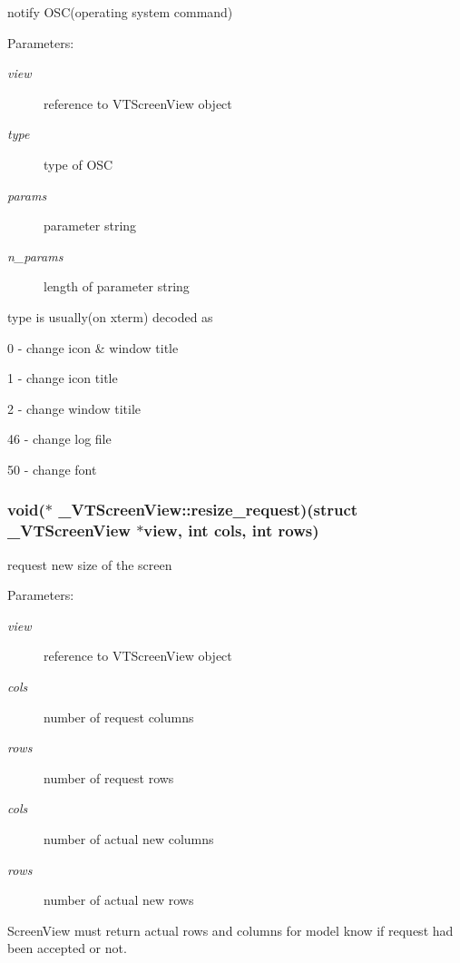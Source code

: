 notify OSC(operating system command)

\begin{Desc}
\item[Parameters:]
\begin{description}
\item[{\em view}]reference to VTScreen\-View object \item[{\em type}]type of OSC \item[{\em params}]parameter string \item[{\em n\_\-params}]length of parameter string\end{description}
\end{Desc}
type is usually(on xterm) decoded as \par
 0 - change icon \& window title \par
 1 - change icon title \par
 2 - change window titile \par
 46 - change log file \par
 50 - change font \par
\subsubsection{\setlength{\rightskip}{0pt plus 5cm}void($\ast$ \_\-VTScreen\-View::resize\_\-request)(struct \_\-VTScreen\-View $\ast$view, int cols, int rows)}\label{struct__VTScreenView_m7}


request new size of the screen

\begin{Desc}
\item[Parameters:]
\begin{description}
\item[{\em view}]reference to VTScreen\-View object \item[{\em cols}]number of request columns \item[{\em rows}]number of request rows \item[{\em cols}]number of actual new columns \item[{\em rows}]number of actual new rows\end{description}
\end{Desc}
Screen\-View must return actual rows and columns for model know if request had been accepted or not. 
